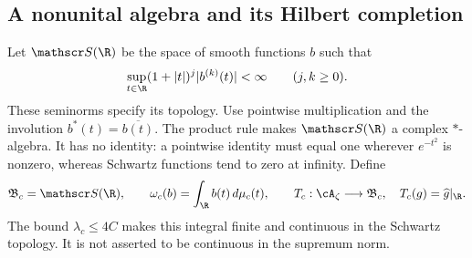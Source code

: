 \subsection{A nonunital algebra and its Hilbert completion}

Let $\mathscr S(\R)$ be the space of smooth functions $b$ such that
\[
 \sup_{t\in\R}(1+|t|)^j|b^{(k)}(t)|<\infty
 \qquad(j,k\geq0).
\]
These seminorms specify its topology.
Use pointwise multiplication and the involution
$b^*(t)=\overline{b(t)}$.
The product rule makes $\mathscr S(\R)$ a complex $*$-algebra.
It has no identity: a pointwise identity must equal one wherever
$e^{-t^2}$ is nonzero, whereas Schwartz functions tend to zero at infinity.
Define
\begin{equation}
 \mathfrak B_c=\mathscr S(\R),\qquad
 \omega_c(b)=\int_{\R}b(t)\,d\mu_c(t),\qquad
 T_c:\cA_\zeta\longrightarrow\mathfrak B_c,
 \quad T_c(g)=\widehat g|_{\R}.
 \label{eq:wp-carrier}
\end{equation}
The bound $\lambda_c\leq4C$ makes this integral finite and continuous
in the Schwartz topology.
It is not asserted to be continuous in the supremum norm.

